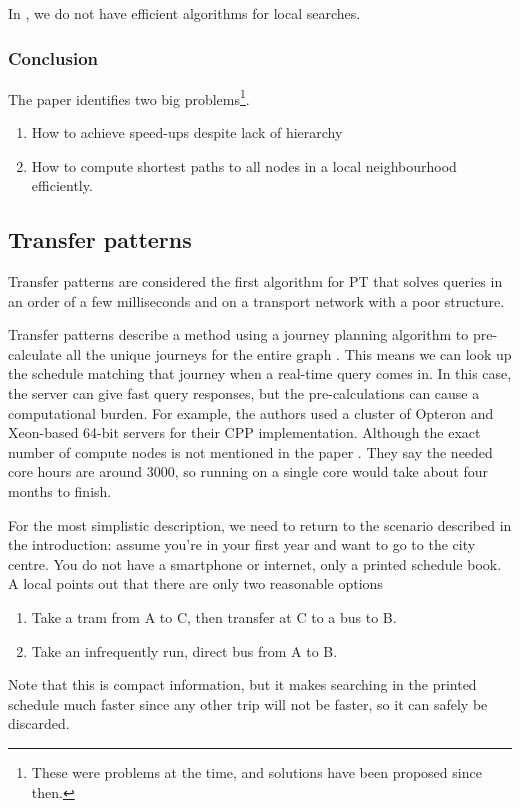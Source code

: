 In , we do not have efficient algorithms for local searches.
\subsubsection{Conclusion}
The paper identifies two big problems\footnote{These were problems at the time, and solutions have been proposed since then.}. 
\begin{enumerate}
    \item How to achieve speed-ups despite lack of hierarchy
    \item How to compute shortest paths to all nodes in a local neighbourhood efficiently.
\end{enumerate}
\subsection{Transfer patterns}
Transfer patterns are considered the first algorithm for PT that solves queries in an order of a few milliseconds and on a transport network with a poor structure. 

Transfer patterns describe a method using a journey planning algorithm to pre-calculate all the unique journeys for the entire graph \cite{bast_fast_2010}. This means we can look up the schedule matching that journey when a real-time query comes in. In this case, the server can give fast query responses, but the pre-calculations can cause a computational burden. For example, the authors used a cluster of Opteron and Xeon-based 64-bit servers for their CPP implementation. Although the exact number of compute nodes is not mentioned in the paper \cite{bast_fast_2010}. They say the needed core hours are around 3000, so running on a single core would take about four months to finish.

For the most simplistic description, we need to return to the scenario described in the introduction: assume you’re in your first year and want to go to the city centre. You do not have a smartphone or internet, only a printed schedule book. A local points out that there are only two reasonable options \begin{enumerate}
    \item Take a tram from A to C, then transfer at C to a bus to B.
    \item Take an infrequently run, direct bus from A to B.
\end{enumerate} 
Note that this is compact information, but it makes searching in the printed schedule much faster since any other trip will not be faster, so it can safely be discarded. \cite{noauthor_update_nodate}



